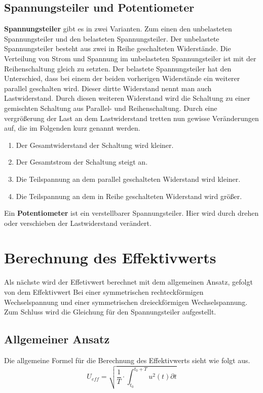         \subsection{Spannungsteiler und Potentiometer}
            \textbf{Spannungsteiler} gibt es in zwei Varianten. Zum einen den unbelasteten Spannungsteiler und den belasteten Spannungsteiler. Der unbelastete Spannungsteiler besteht aus zwei in Reihe geschalteten Widerstände. Die Verteilung von Strom und Spannung im unbelasteten Spannungsteiler ist mit der Reihenschaltung gleich zu setzten. 
            Der belastete Spannungsteiler hat den Unterschied, dass bei einem der beiden vorherigen Widerstände ein weiterer parallel geschalten wird. Dieser  dirtte Widerstand nennt man auch Lastwiderstand.
            Durch diesen weiteren Widerstand wird die Schaltung zu einer gemischten Schaltung aus Parallel- und Reihenschaltung. Durch eine vergrößerung der Last an dem Lastwiderstand tretten nun gewisse Veränderungen auf, die im Folgenden kurz genannt werden. 
            \begin{enumerate}
                \item Der Gesamtwiderstand der Schaltung wird kleiner.
                \item Der Gesamtstrom der Schaltung steigt an.
                \item Die Teilspannung an dem parallel geschalteten Widerstand wird kleiner.
                \item Die Teilspannung an dem in Reihe geschalteten Widerstand wird größer.
            \end{enumerate} 

            Ein \textbf{Potentiometer} ist ein verstellbarer Spannungsteiler. Hier wird durch drehen oder verschieben der Lastwiderstand verändert. 

    \section{Berechnung des Effektivwerts}
        Als nächste wird der Effetivwert berechnet mit dem allgemeinen Ansatz, gefolgt von dem Effektivwert Bei einer symmetrischen rechteckförmigen Wechselspannung und einer symmetrischen dreieckförmigen Wechselspannung. Zum Schluss wird die Gleichung für den Spannungsteiler aufgestellt.
        \subsection{Allgemeiner Ansatz}
            Die allgemeine Formel für die Berechnung des Effektivwerts sieht wie folgt aus.
            \begin{equation}
                U_{eff}=\sqrt{\frac{1}{T}\cdot\int_{t_0}^{t_0+T} u^2(t)\partial t}
            \end{equation}

